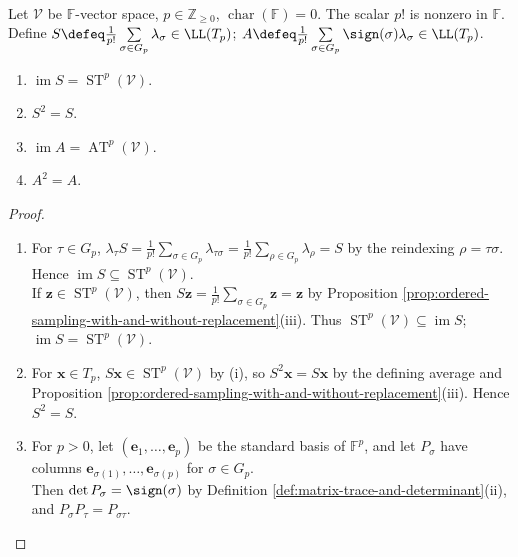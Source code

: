 \begin{proposition} \label{prop:symmetrization-map} \\
Let $\mathcal{V}$ be $\mathbb{F}$-vector space, $p\in\mathbb{Z}_{\geq0}$, $\operatorname{char}(\mathbb{F})=0$. The scalar $p!$ is nonzero in $\mathbb{F}$.\\
Define $S\defeq\frac{1}{p!}\sum\limits_{\sigma\in G_p}\lambda_{\sigma}\in\LL(T_p)$; $A\defeq\frac{1}{p!}\sum\limits_{\sigma\in G_p}\sign(\sigma)\lambda_{\sigma}\in\LL(T_p)$.
\begin{enumerate}[label=(\roman*)]
\setlength{\itemsep}{0pt}
\item $\operatorname{im}S=\operatorname{ST}^{p}(\mathcal{V})$.
\item $S^2=S$.
\item $\operatorname{im}A=\operatorname{AT}^{p}(\mathcal{V})$.
\item $A^2=A$.
\end{enumerate}
\begin{proof}
\begin{enumerate}[label=(\roman*)]
\setlength{\itemsep}{0pt}
\item For $\tau\in G_p$, $\lambda_{\tau}S=\frac{1}{p!}\sum\limits_{\sigma\in G_p}\lambda_{\tau\sigma}=\frac{1}{p!}\sum\limits_{\rho\in G_p}\lambda_{\rho}=S$ by the reindexing $\rho=\tau\sigma$. Hence $\operatorname{im}S\subseteq\operatorname{ST}^{p}(\mathcal{V})$.\\
If $\mathbf{z}\in\operatorname{ST}^{p}(\mathcal{V})$, then $S\mathbf{z}=\frac{1}{p!}\sum\limits_{\sigma\in G_p}\mathbf{z}=\mathbf{z}$ by Proposition \ref{prop:ordered-sampling-with-and-without-replacement}(iii). Thus $\operatorname{ST}^{p}(\mathcal{V})\subseteq\operatorname{im}S$; $\operatorname{im}S=\operatorname{ST}^{p}(\mathcal{V})$.
\item For $\mathbf{x}\in T_p$, $S\mathbf{x}\in\operatorname{ST}^{p}(\mathcal{V})$ by (i), so $S^2\mathbf{x}=S\mathbf{x}$ by the defining average and Proposition \ref{prop:ordered-sampling-with-and-without-replacement}(iii). Hence $S^2=S$.
\item For $p>0$, let $(\mathbf{e}_1,\ldots,\mathbf{e}_p)$ be the standard basis of $\mathbb{F}^{p}$, and let $P_{\sigma}$ have columns $\mathbf{e}_{\sigma(1)},\ldots,\mathbf{e}_{\sigma(p)}$ for $\sigma\in G_p$.\\
Then $\det P_{\sigma}=\sign(\sigma)$ by Definition \ref{def:matrix-trace-and-determinant}(ii), and $P_{\sigma}P_{\tau}=P_{\sigma\tau}$.\\

\end{enumerate}
\end{proof}
\end{proposition}
